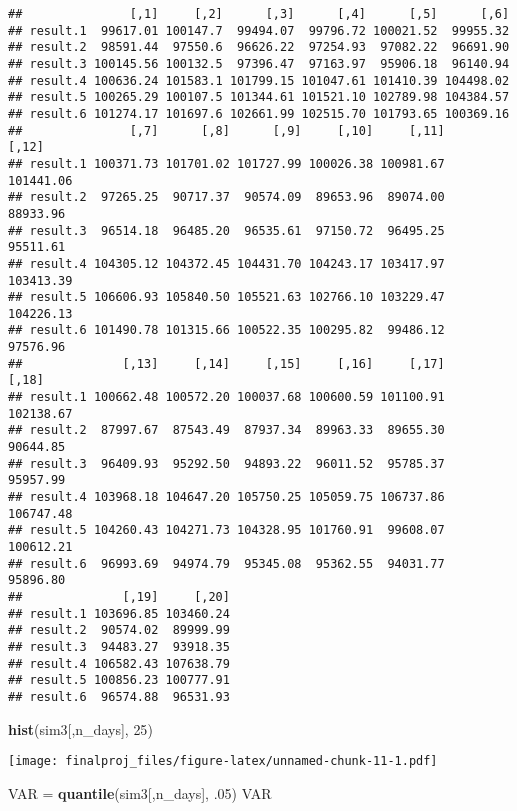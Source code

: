 \documentclass[]{article}
\newenvironment{Shaded}{\begin{snugshade}}{\end{snugshade}}
\newcommand{\DecValTok}[1]{\textcolor[rgb]{0.00,0.00,0.81}{#1}}
\newcommand{\FloatTok}[1]{\textcolor[rgb]{0.00,0.00,0.81}{#1}}
\newcommand{\KeywordTok}[1]{\textcolor[rgb]{0.13,0.29,0.53}{\textbf{#1}}}
\newcommand{\NormalTok}[1]{#1}
\newcommand{\StringTok}[1]{\textcolor[rgb]{0.31,0.60,0.02}{#1}}
\begin{document}
\begin{verbatim}
##               [,1]     [,2]      [,3]      [,4]      [,5]      [,6]
## result.1  99617.01 100147.7  99494.07  99796.72 100021.52  99955.32
## result.2  98591.44  97550.6  96626.22  97254.93  97082.22  96691.90
## result.3 100145.56 100132.5  97396.47  97163.97  95906.18  96140.94
## result.4 100636.24 101583.1 101799.15 101047.61 101410.39 104498.02
## result.5 100265.29 100107.5 101344.61 101521.10 102789.98 104384.57
## result.6 101274.17 101697.6 102661.99 102515.70 101793.65 100369.16
##               [,7]      [,8]      [,9]     [,10]     [,11]     [,12]
## result.1 100371.73 101701.02 101727.99 100026.38 100981.67 101441.06
## result.2  97265.25  90717.37  90574.09  89653.96  89074.00  88933.96
## result.3  96514.18  96485.20  96535.61  97150.72  96495.25  95511.61
## result.4 104305.12 104372.45 104431.70 104243.17 103417.97 103413.39
## result.5 106606.93 105840.50 105521.63 102766.10 103229.47 104226.13
## result.6 101490.78 101315.66 100522.35 100295.82  99486.12  97576.96
##              [,13]     [,14]     [,15]     [,16]     [,17]     [,18]
## result.1 100662.48 100572.20 100037.68 100600.59 101100.91 102138.67
## result.2  87997.67  87543.49  87937.34  89963.33  89655.30  90644.85
## result.3  96409.93  95292.50  94893.22  96011.52  95785.37  95957.99
## result.4 103968.18 104647.20 105750.25 105059.75 106737.86 106747.48
## result.5 104260.43 104271.73 104328.95 101760.91  99608.07 100612.21
## result.6  96993.69  94974.79  95345.08  95362.55  94031.77  95896.80
##              [,19]     [,20]
## result.1 103696.85 103460.24
## result.2  90574.02  89999.99
## result.3  94483.27  93918.35
## result.4 106582.43 107638.79
## result.5 100856.23 100777.91
## result.6  96574.88  96531.93
\end{verbatim}

\begin{Shaded}
\begin{Highlighting}[]
\KeywordTok{hist}\NormalTok{(sim3[,n_days], }\DecValTok{25}\NormalTok{)}
\end{Highlighting}
\end{Shaded}

\texttt{[image: finalproj\_files/figure-latex/unnamed-chunk-11-1.pdf]}

\begin{Shaded}
\begin{Highlighting}[]
\NormalTok{VAR =}\StringTok{ }\KeywordTok{quantile}\NormalTok{(sim3[,n_days], }\FloatTok{.05}\NormalTok{)}
\NormalTok{VAR}
\end{Highlighting}
\end{Shaded}
\end{document}
